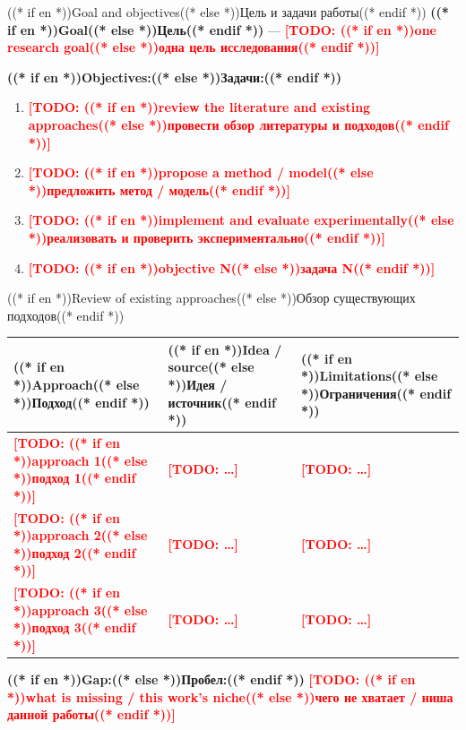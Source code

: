 \documentclass[aspectratio=169, 14pt]{beamer}
\newcommand{\todo}[1]{\textcolor{red}{\textbf{[TODO: #1]}}}
\begin{document}
\begin{frame}{((* if en *))Goal and objectives((* else *))Цель и задачи работы((* endif *))}
  \textcolor{hseblue}{\textbf{((* if en *))Goal((* else *))Цель((* endif *))}} — \todo{((* if en *))one research goal((* else *))одна цель исследования((* endif *))}

  \vspace{0.5em}
  {\color{hseblue}\textbf{((* if en *))Objectives:((* else *))Задачи:((* endif *))}}
  \begin{enumerate}
    \item \todo{((* if en *))review the literature and existing approaches((* else *))провести обзор литературы и подходов((* endif *))}
    \item \todo{((* if en *))propose a method / model((* else *))предложить метод / модель((* endif *))}
    \item \todo{((* if en *))implement and evaluate experimentally((* else *))реализовать и проверить экспериментально((* endif *))}
    \item \todo{((* if en *))objective N((* else *))задача N((* endif *))}
  \end{enumerate}
\end{frame}

\begin{frame}{((* if en *))Review of existing approaches((* else *))Обзор существующих подходов((* endif *))}
  \begingroup\footnotesize
  \begin{tabularx}{\textwidth}{lXX}
    \toprule
    \textbf{((* if en *))Approach((* else *))Подход((* endif *))} &
    \textbf{((* if en *))Idea / source((* else *))Идея / источник((* endif *))} &
    \textbf{((* if en *))Limitations((* else *))Ограничения((* endif *))} \\
    \midrule
    \todo{((* if en *))approach 1((* else *))подход 1((* endif *))} & \todo{…} & \todo{…} \\
    \todo{((* if en *))approach 2((* else *))подход 2((* endif *))} & \todo{…} & \todo{…} \\
    \todo{((* if en *))approach 3((* else *))подход 3((* endif *))} & \todo{…} & \todo{…} \\
    \bottomrule
  \end{tabularx}%
  \endgroup

  \vspace{0.5em}
  {\color{hseblue}\textbf{((* if en *))Gap:((* else *))Пробел:((* endif *))}} \todo{((* if en *))what is missing / this work's niche((* else *))чего не хватает / ниша данной работы((* endif *))}
\end{frame}
\end{document}
